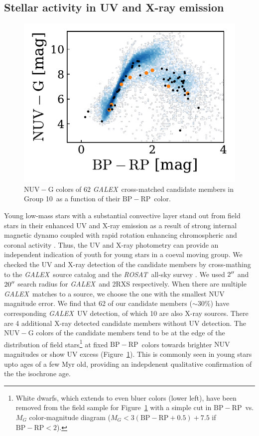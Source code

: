 \documentclass[modern,letterpaper]{aastex61}
\newcommand{\project}[1]{\textsl{#1}}
\newcommand{\acronym}[1]{{\small{#1}}}
\newcommand{\galex}{\project{\acronym{GALEX}}}
\newcommand{\rosat}{\project{\acronym{ROSAT}}}
\newcommand{\figname}{Figure}
\newcommand{\groupTen}{Group 10}
\newcommand{\bprp}{\ensuremath{\mathrm{BP}-\mathrm{RP}}}
\begin{document}
\subsection{Stellar activity in UV and X-ray emission}

\begin{figure}
  \centering
  \includegraphics{nuv_xray.pdf}
  \caption{$\mathrm{NUV}-\mathrm{G}$ colors of 62 \galex\ cross-matched
    candidate members in \groupTen\ as a function of their \bprp\ color.
    }
  \label{fig:nuv}
\end{figure}

Young low-mass stars with a substantial convective layer stand out from
field stars in their enhanced UV and X-ray emission
as a result of strong internal magnetic dynamo coupled with rapid rotation
enhancing chromospheric and coronal activity
\citep{2004ARA&A..42..685Z,2008hsf2.book..757T,2011ApJ...727....6S,2013ApJ...774..101R}.
Thus, the UV and X-ray photometry can provide an independent indication of youth
for young stars in a coeval moving group.
We checked the UV and X-ray detection of
the candidate members by cross-mathing to the \galex\ source catalog
\citep{2005ApJ...619L...1M} and the \rosat\ all-sky survey
\citep[2RXS;][]{2016A&A...588A.103B}.
We used $2\mbox{$^{\prime\prime}$}$ and $20\mbox{$^{\prime\prime}$}$ search radius for \galex\ and 2RXS respectively.
When there are multiple \galex\ matches to a source, we choose the one with
the smallest NUV magnitude error.
We find that 62 of our candidate members ($\sim30$\%) have corresponding \galex\
UV detection, of which 10 are also X-ray sources.
There are 4 additional X-ray detected candidate members without UV detection.
The $\mathrm{NUV}-\mathrm{G}$ colors of the candidate members tend
to be at the edge of the distribution of field stars\footnote{
  White dwarfs, which extends to even bluer colors (lower left), have been removed
  from the field sample for \figname~\ref{fig:nuv} with a simple cut in
  \bprp\ vs. $M_G$ color-magnitude diagram ($M_G< 3(\bprp+0.5)+7.5$ if $\bprp<2$).
}
at fixed \bprp\ colors towards brighter
$\mathrm{NUV}$ magnitudes or show UV excess (\figname~\ref{fig:nuv}).
This is commonly seen in young stars upto ages of a few Myr old,
providing an indepdenent qualitative confirmation of the the isochrone age.
\end{document}
